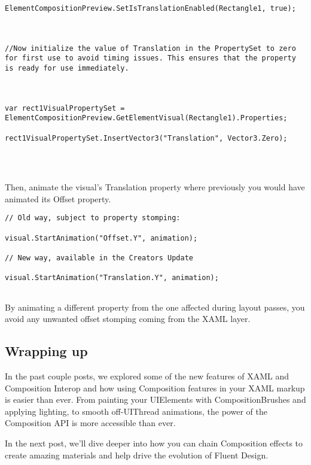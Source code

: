 \begin{lstlisting}[style=CSharpStyle]
ElementCompositionPreview.SetIsTranslationEnabled(Rectangle1, true);



//Now initialize the value of Translation in the PropertySet to zero for first use to avoid timing issues. This ensures that the property is ready for use immediately.



var rect1VisualPropertySet = ElementCompositionPreview.GetElementVisual(Rectangle1).Properties;

rect1VisualPropertySet.InsertVector3("Translation", Vector3.Zero);




\end{lstlisting}

Then, animate the visual’s Translation property where previously you would have animated its Offset property.

\begin{lstlisting}[style=CSharpStyle]
// Old way, subject to property stomping:

visual.StartAnimation("Offset.Y", animation);

// New way, available in the Creators Update

visual.StartAnimation("Translation.Y", animation);


\end{lstlisting}

By animating a different property from the one affected during layout passes, you avoid any unwanted offset stomping coming from the XAML layer.

\subsection{Wrapping up}

In the past couple posts, we explored some of the new features of XAML and Composition Interop and how using Composition features in your XAML markup is easier than ever. From painting your UIElements with CompositionBrushes and applying lighting, to smooth off-UIThread animations, the power of the Composition API is more accessible than ever.

In the next post, we’ll dive deeper into how you can chain Composition effects to create amazing materials and help drive the evolution of Fluent Design.
